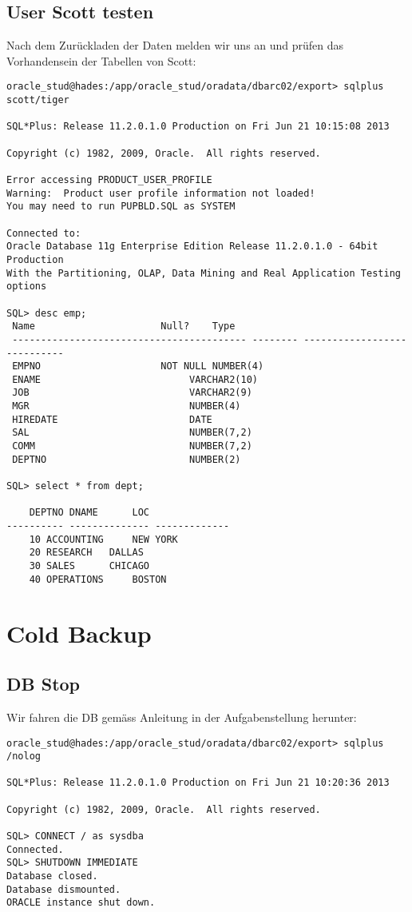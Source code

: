 \documentclass[11pt,a4paper,parskip=half]{scrartcl}
\begin{document}
\subsection{User Scott testen}
Nach dem Zurückladen der Daten melden wir uns an und prüfen das Vorhandensein der Tabellen von Scott:
\begin{lstlisting}
oracle_stud@hades:/app/oracle_stud/oradata/dbarc02/export> sqlplus scott/tiger

SQL*Plus: Release 11.2.0.1.0 Production on Fri Jun 21 10:15:08 2013

Copyright (c) 1982, 2009, Oracle.  All rights reserved.

Error accessing PRODUCT_USER_PROFILE
Warning:  Product user profile information not loaded!
You may need to run PUPBLD.SQL as SYSTEM

Connected to:
Oracle Database 11g Enterprise Edition Release 11.2.0.1.0 - 64bit Production
With the Partitioning, OLAP, Data Mining and Real Application Testing options

SQL> desc emp;
 Name					   Null?    Type
 ----------------------------------------- -------- ----------------------------
 EMPNO					   NOT NULL NUMBER(4)
 ENAME						    VARCHAR2(10)
 JOB						    VARCHAR2(9)
 MGR						    NUMBER(4)
 HIREDATE					    DATE
 SAL						    NUMBER(7,2)
 COMM						    NUMBER(7,2)
 DEPTNO 					    NUMBER(2)

SQL> select * from dept;

    DEPTNO DNAME	  LOC
---------- -------------- -------------
	10 ACCOUNTING	  NEW YORK
	20 RESEARCH	  DALLAS
	30 SALES	  CHICAGO
	40 OPERATIONS	  BOSTON

\end{lstlisting}


\section{Cold Backup}
\subsection{DB Stop}
Wir fahren die DB gemäss Anleitung in der Aufgabenstellung herunter:
\begin{lstlisting}
oracle_stud@hades:/app/oracle_stud/oradata/dbarc02/export> sqlplus /nolog

SQL*Plus: Release 11.2.0.1.0 Production on Fri Jun 21 10:20:36 2013

Copyright (c) 1982, 2009, Oracle.  All rights reserved.

SQL> CONNECT / as sysdba
Connected.
SQL> SHUTDOWN IMMEDIATE
Database closed.
Database dismounted.
ORACLE instance shut down.
\end{lstlisting}
\end{document}
